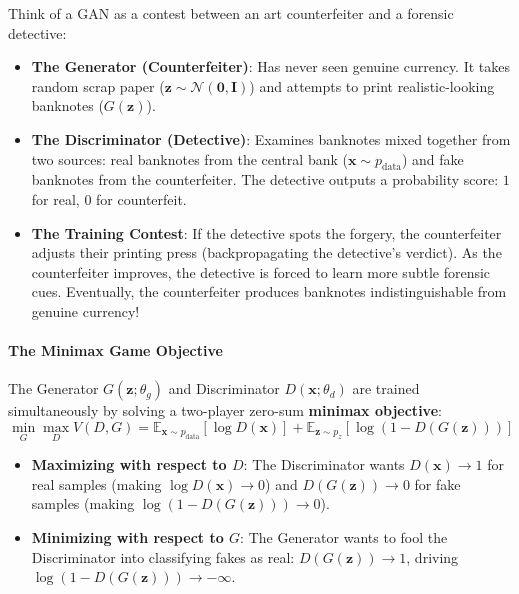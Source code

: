 \begin{analogy}
Think of a GAN as a contest between an art counterfeiter and a forensic detective:
\begin{itemize}
    \item \textbf{The Generator (Counterfeiter)}: Has never seen genuine currency. It takes random scrap paper ($\mathbf{z} \sim \mathcal{N}(\mathbf{0}, \mathbf{I})$) and attempts to print realistic-looking banknotes ($G(\mathbf{z})$).
    \item \textbf{The Discriminator (Detective)}: Examines banknotes mixed together from two sources: real banknotes from the central bank ($\mathbf{x} \sim p_{\text{data}}$) and fake banknotes from the counterfeiter. The detective outputs a probability score: $1$ for real, $0$ for counterfeit.
    \item \textbf{The Training Contest}: If the detective spots the forgery, the counterfeiter adjusts their printing press (backpropagating the detective's verdict). As the counterfeiter improves, the detective is forced to learn more subtle forensic cues. Eventually, the counterfeiter produces banknotes indistinguishable from genuine currency!
\end{itemize}
\end{analogy}

\paragraph{The Minimax Game Objective}
The Generator $G(\mathbf{z}; \theta_g)$ and Discriminator $D(\mathbf{x}; \theta_d)$ are trained simultaneously by solving a two-player zero-sum \textbf{minimax objective}:
\begin{equation}
\min_G \max_D V(D, G) = \mathbb{E}_{\mathbf{x} \sim p_{\text{data}}}[\log D(\mathbf{x})] + \mathbb{E}_{\mathbf{z} \sim p_z}[\log(1 - D(G(\mathbf{z})))]\label{eq:gan_minimax}
\end{equation}

\begin{itemize}
    \item \textbf{Maximizing with respect to $D$}: The Discriminator wants $D(\mathbf{x}) \to 1$ for real samples (making $\log D(\mathbf{x}) \to 0$) and $D(G(\mathbf{z})) \to 0$ for fake samples (making $\log(1 - D(G(\mathbf{z}))) \to 0$).
    \item \textbf{Minimizing with respect to $G$}: The Generator wants to fool the Discriminator into classifying fakes as real: $D(G(\mathbf{z})) \to 1$, driving $\log(1 - D(G(\mathbf{z}))) \to -\infty$.
\end{itemize}

